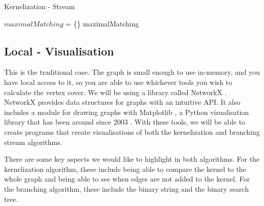 \begin{algorithm}[htb]
    \caption{Kernelization - Stream}
    \label{alg:kernelization_stream}
    \DontPrintSemicolon


    $maximalMatching$ = \{\}\;
    \Return maximalMatching\;
\end{algorithm}

\subsection{Local - Visualisation}

This is the traditional case. The graph is small enough to use in-memory, and
you have local access to it, so you are able to use whichever tools you wish to
calculate the vertex cover. We will be using a library called NetworkX
\cite{hagberg2008exploring}. NetworkX provides data structures for graphs with
an intuitive API. It also includes a module for drawing graphs with Matplotlib
\cite{hunter2007matplotlib}, a Python visualisation library that has been
around since 2003 \cite{matplotlib2003copyright}. With these tools, we will be
able to create programs that create visualisations of both the kernelization
and branching stream algorithms.

There are some key aspects we would like to highlight in both algorithms. For
the kernelization algorithm, these include being able to compare the kernel to
the whole graph and being able to see when edges are not added to the kernel.
For the branching algorithm, these include the binary string and the binary
search tree.

